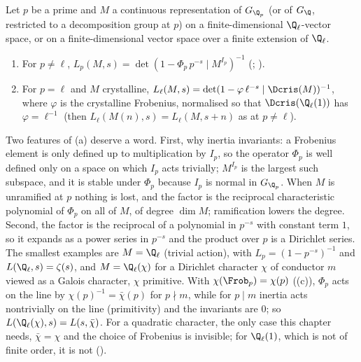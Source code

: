 \begin{definition}\label{def:lfunctions:local-factor}
Let $p$ be a prime and $M$ a continuous representation of $G_{\Q_p}$ (or of $G_\Q$, restricted to a decomposition group at $p$) on a finite-dimensional
$\Q_\ell$-vector space, or on a finite-dimensional vector space over a finite extension of $\Q_\ell$.
\begin{enumerate}[label=(\alph*)]
\item For $p\ne\ell$, $L_p(M,s)=\det(1-\Phi_p\,p^{-s}\mid M^{I_p})^{-1}$ (; ).
\item For $p=\ell$ and $M$ crystalline, $L_\ell(M,s)=\det(1-\varphi\,\ell^{-s}\mid\Dcris(M))^{-1}$, where $\varphi$ is the crystalline Frobenius, normalised so that
$\Dcris(\Q_\ell(1))$ has $\varphi=\ell^{-1}$ (then $L_\ell(M(n),s)=L_\ell(M,s+n)$ as at $p\ne\ell$).
\end{enumerate}
\end{definition}

Two features of (a) deserve a word. First, why inertia invariants: a Frobenius element is only defined up to multiplication by $I_p$, so the operator $\Phi_p$ is well defined
only on a space on which $I_p$ acts trivially; $M^{I_p}$ is the largest such subspace, and it is stable under $\Phi_p$ because $I_p$ is normal in $G_{\Q_p}$. When $M$ is unramified
at $p$ nothing is lost, and the factor is the reciprocal characteristic polynomial of $\Phi_p$ on all of $M$, of degree $\dim M$; ramification lowers the degree. Second, the
factor is the reciprocal of a polynomial in $p^{-s}$ with constant term $1$, so it expands as a power series in $p^{-s}$ and the product over $p$ is a Dirichlet series. The
smallest examples are $M=\Q_\ell$ (trivial action), with $L_p=(1-p^{-s})^{-1}$ and $L(\Q_\ell,s)=\zeta(s)$, and $M=\Q_\ell(\chi)$ for a Dirichlet character $\chi$ of conductor $m$
viewed as a Galois character, $\chi$ primitive. With $\chi(\Frob_p)=\chi(p)$ ((c)), $\Phi_p$ acts on the line by $\chi(p)^{-1}=\bar\chi(p)$ for
$p\nmid m$, while for $p\mid m$ inertia acts nontrivially on the line (primitivity) and the invariants are $0$; so $L(\Q_\ell(\chi),s)=L(s,\bar\chi)$. For a quadratic character,
the only case this chapter needs, $\bar\chi=\chi$ and the choice of Frobenius is invisible; for $\Q_\ell(1)$, which is not of finite order, it is not
().

